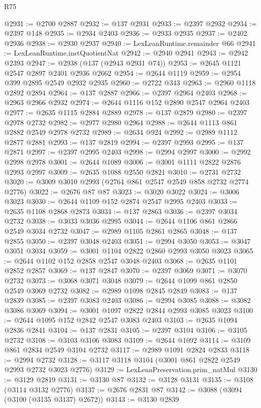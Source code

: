 \begin{lexlean}{R75}
\begin{coremodule}
@2931 := @2700 @2887
@2932 := @137 @2931
@2933 := @2397 @2932
@2934 := @2397 @148
@2935 := @2934 @2403
@2936 := @2933 @2935
@2937 := @2402 @2936
@2938 := @2930 @2937
@2940 := LexLeanRuntime.remainder @66
@2941 := LexLeanRuntime.instQuotientNat
@2942 := @2940 @2941
@2943 := @2942 @2393
@2947 := @2938 (@137 (@2943 @2931 @74))
@2953 := @2645 @1121 @2547 @2897 @2401 @2936 @2662
@2954 := @2644 @1119
@2959 := @2954 @399 @2895 @2549 @2932 @2935
@2960 := @2722 @343
@2963 := @2960 @1118 @2892 @2894
@2964 := @137 @2887
@2966 := @2397 @2964 @2403
@2968 := @2963 @2966 @2932
@2974 := @2644 @1116 @152 @2890 @2547 @2964 @2403
@2977 := @2635 @1115 @2884 @2889
@2978 := @137 @2879
@2980 := @2397 @2978 @2732
@2982 := @2977 @2980 @2964
@2988 := @2644 @1113 @861 @2882 @2549 @2978 @2732
@2989 := @2634 @924
@2992 := @2989 @1112 @2877 @2881
@2993 := @137 @2819
@2994 := @2397 @2993
@2995 := @137 @2871
@2997 := @2397 @2995 @2403
@2998 := @2994 @2997
@3000 := @2992 @2998 @2978
@3001 := @2644 @1089
@3006 := @3001 @1111 @2822 @2876 @2993 @2997
@3009 := @2635 @1088 @2550 @2821
@3010 := @2731 @2732
@3020 := @3009 @3010 @2993 (@2764 @861 @2547 @2549 @858 @2732 @2774 @2776)
@3022 := @2676 @87 @87
@3023 := @3020 @3022
@3024 := @3006 @3023
@3030 := @2644 @1109 @152 @2874 @2547 @2995 @2403
@3033 := @2635 @1108 @2868 @2873
@3034 := @137 @2863
@3036 := @2397 @3034 @2732
@3038 := @3033 @3036 @2995
@3044 := @2644 @1106 @861 @2866 @2549 @3034 @2732
@3047 := @2989 @1105 @2861 @2865
@3048 := @137 @2855
@3050 := @2397 @3048 @2403
@3051 := @2994 @3050
@3053 := @3047 @3051 @3034
@3059 := @3001 @1104 @2822 @2860 @2993 @3050 @3023
@3065 := @2644 @1102 @152 @2858 @2547 @3048 @2403
@3068 := @2635 @1101 @2852 @2857
@3069 := @137 @2847
@3070 := @2397 @3069
@3071 := @3070 @2732
@3073 := @3068 @3071 @3048
@3079 := @2644 @1099 @861 @2850 @2549 @3069 @2732
@3082 := @2989 @1098 @2845 @2849
@3083 := @137 @2839
@3085 := @2397 @3083 @2403
@3086 := @2994 @3085
@3088 := @3082 @3086 @3069
@3094 := @3001 @1097 @2822 @2844 @2993 @3085 @3023
@3100 := @2644 @1095 @152 @2842 @2547 @3083 @2403
@3103 := @2635 @1094 @2836 @2841
@3104 := @137 @2831
@3105 := @2397 @3104
@3106 := @3105 @2732
@3108 := @3103 @3106 @3083
@3109 := @2644 @1092
@3114 := @3109 @861 @2834 @2549 @3104 @2732
@3117 := @2989 @1091 @2824 @2833
@3118 := @2994 @2732
@3128 := @3117 @3118 @3104 (@3001 @861 @2822 @2549 @2993 @2732 @3023 @2776)
@3129 := LexLeanPreservation.prim_natMul
@3130 := @3129 @2819
@3131 := @3130 @87
@3132 := @3128 @3131
@3135 := @3108 (@3114 @3132 @2776)
@3137 := @2676 @2831 @87
@3142 := @3088 (@3094 (@3100 (@3135 @3137) @2672))
@3143 := @3130 @2839

\end{coremodule}
\end{lexlean}
